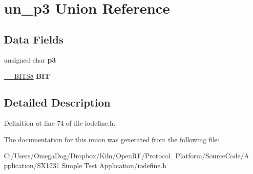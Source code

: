\hypertarget{unionun__p3}{\section{un\-\_\-p3 Union Reference}
\label{unionun__p3}
}
\subsection*{Data Fields}
\begin{DoxyCompactItemize}
\item 
\hypertarget{unionun__p3_aade08c986b1bb6542d488ad22fd08f4f}{unsigned char {\bfseries p3}}\label{unionun__p3_aade08c986b1bb6542d488ad22fd08f4f}

\item 
\hypertarget{unionun__p3_ad3b5201d1b8d94d2932abe43143d139b}{\hyperlink{struct_____b_i_t_s8}{\-\_\-\-\_\-\-B\-I\-T\-S8} {\bfseries B\-I\-T}}\label{unionun__p3_ad3b5201d1b8d94d2932abe43143d139b}

\end{DoxyCompactItemize}


\subsection{Detailed Description}


Definition at line 74 of file iodefine.\-h.



The documentation for this union was generated from the following file\-:\begin{DoxyCompactItemize}
\item 
C\-:/\-Users/\-Omega\-Dog/\-Dropbox/\-Kiln/\-Open\-R\-F/\-Protocol\-\_\-\-Platform/\-Source\-Code/\-Application/\-S\-X1231 Simple Test Application/iodefine.\-h\end{DoxyCompactItemize}
